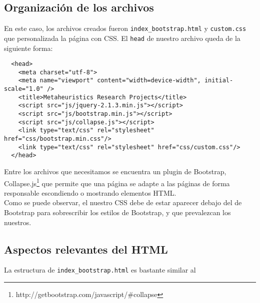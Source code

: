 \documentclass[10pt,a4paper]{article}
\begin{document}
\subsection{Organización de los archivos}
En este caso, los archivos creados fueron \texttt{index\_bootstrap.html} y \texttt{custom.css} que personalizada la página con CSS.
El \texttt{head} de nuestro archivo queda de la siguiente forma:
\begin{verbatim}
  <head>
    <meta charset="utf-8">
    <meta name="viewport" content="width=device-width", initial-scale="1.0" />
    <title>Metaheuristics Research Projects</title>
    <script src="js/jquery-2.1.3.min.js"></script>
    <script src="js/bootstrap.min.js"></script>
    <script src="js/collapse.js"></script>
    <link type="text/css" rel="stylesheet" href="css/bootstrap.min.css"/>
    <link type="text/css" rel="stylesheet" href="css/custom.css"/>
  </head>
\end{verbatim}

Entre los archivos que necesitamos se encuentra un plugin de Bootstrap, Collapse.js\footnote{http://getbootstrap.com/javascript/\#collapse} que permite que una página se adapte a las páginas de forma responsable escondiendo o mostrando elementos HTML.\\

Como se puede observar, el nuestro CSS debe de estar aparecer debajo del de Bootstrap para sobrescribir los estilos de Bootstrap, y que prevalezcan los nuestros.

\subsection{Aspectos relevantes del HTML}

La estructura de \texttt{index\_bootstrap.html} es bastante similar al 
\end{document}
